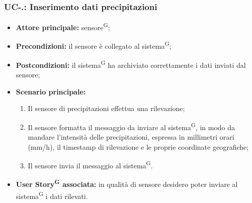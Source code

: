\documentclass[8pt]{article}
\newcommand{\glossterm}[1]{#1\textsuperscript{G}} %
\begin{document}
\subsubsection*{UC-\theuc .\speconenumber: Inserimento dati precipitazioni}
\begin{itemize}
    \item \textbf{Attore principale:} \glossterm{sensore};
    \item \textbf{Precondizioni:} il sensore è collegato al \glossterm{sistema};
    \item \textbf{Postcondizioni:} il \glossterm{sistema} ha archiviato correttamente i dati inviati dal sensore;
    \item \textbf{Scenario principale:}
        \begin{enumerate}
        \item Il sensore di precipitazioni effettua una rilevazione;
        \item Il sensore formatta il messaggio da inviare al \glossterm{sistema}, in modo da mandare l'intensità delle precipitazioni, espressa in millimetri orari (mm/h), il timestamp di rilevazione e le proprie
coordinate geografiche;
        \item Il sensore invia il messaggio al \glossterm{sistema}.
        \end{enumerate}
    \item \textbf{\glossterm{User Story} associata:} in qualità di sensore desidero poter inviare al \glossterm{sistema} i dati rilevati.
\end{itemize}
\end{document}
